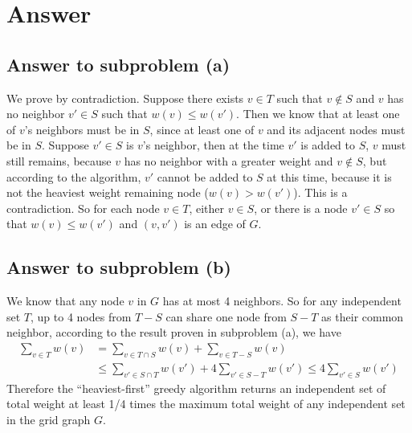 \documentclass[12pt,letterpaper]{article}
\begin{document}
\section*{Answer}
\subsection*{Answer to subproblem (a)}
We prove by contradiction. Suppose there exists $v\in T$ such that $v\notin S$ and $v$ has no neighbor $v' \in S$ such that $w(v) \le w(v')$. Then we know that at least one of $v$'s neighbors must be in $S$, since at least one of $v$ and its adjacent nodes must be in $S$. Suppose $v'\in S$ is $v$'s neighbor, then at the time $v'$ is added to $S$, $v$ must still remains, because $v$ has no neighbor with a greater weight and $v\notin S$, but according to the algorithm, $v'$ cannot be added to $S$ at this time, because it is not the heaviest weight remaining node ($w(v)>w(v')$). This is a contradiction. So for
each node $v \in T$, either $v \in S$, or there is a node $v'\in S$ so that $w(v) \le w(v')$
and $(v, v')$ is an edge of $G$.

\subsection*{Answer to subproblem (b)}
We know that any node $v$ in $G$ has at most 4 neighbors. So for any independent set $T$, up to 4 nodes from $T-S$ can share one node from $S-T$ as their common neighbor, according to the result proven in subproblem (a), we have
\begin{align}
\nonumber\sum_{v\in T}w(v) & =\sum_{v\in T\cap S}w(v)+\sum_{v\in T-S}w(v)\\
& \le \sum_{v'\in S\cap T}w(v')+4\sum_{v'\in S-T}w(v')\le 4\sum_{v'\in S}w(v')
\end{align}
Therefore the ``heaviest-first'' greedy algorithm returns an independent
set of total weight at least 1/4 times the maximum total weight of
any independent set in the grid graph $G$.
\end{document}
